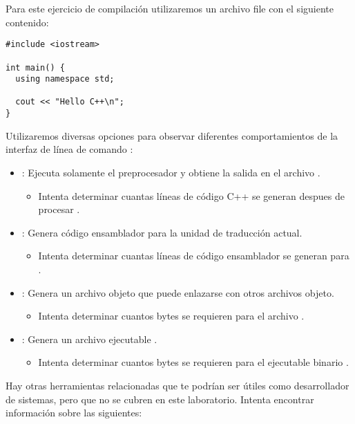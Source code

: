 Para este ejercicio de compilación utilizaremos un archivo  file 
con el siguiente contenido:

\begin{lstlisting}
#include <iostream>

int main() {
  using namespace std;

  cout << "Hello C++\n";
}
\end{lstlisting}

Utilizaremos diversas opciones para observar diferentes comportamientos de la interfaz de línea de comando
:

\begin{itemize}
  \item {}: 
  Ejecuta solamente el preprocesador y obtiene la salida en el archivo .
    \begin{itemize}
      \item Intenta determinar cuantas líneas de código C++ se generan despues de procesar .
    \end{itemize}

  \item {}:
  Genera código ensamblador para la unidad de traducción actual.
    \begin{itemize}
      \item Intenta determinar cuantas líneas de código ensamblador se generan para .
    \end{itemize}

  \item {}:
  Genera un archivo objeto  que puede enlazarse con otros archivos objeto.
    \begin{itemize}
      \item Intenta determinar cuantos bytes se requieren para el archivo .
    \end{itemize}

  \item {}:
  Genera un archivo ejecutable .
    \begin{itemize}
      \item Intenta determinar cuantos bytes se requieren para el ejecutable binario .
    \end{itemize}
\end{itemize}

Hay otras herramientas relacionadas que te podrían ser útiles como desarrollador de sistemas,
pero que no se cubren en este laboratorio.
Intenta encontrar información sobre las siguientes:

